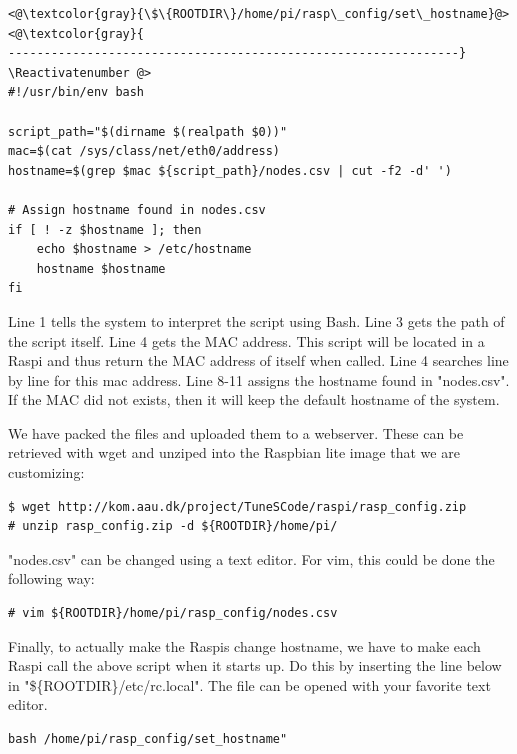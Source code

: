 \Suppressnumber\begin{lstlisting}[]
<@\textcolor{gray}{\$\{ROOTDIR\}/home/pi/rasp\_config/set\_hostname}@>
<@\textcolor{gray}{
---------------------------------------------------------------}
\Reactivatenumber @>
#!/usr/bin/env bash

script_path="$(dirname $(realpath $0))"
mac=$(cat /sys/class/net/eth0/address)
hostname=$(grep $mac ${script_path}/nodes.csv | cut -f2 -d' ')

# Assign hostname found in nodes.csv
if [ ! -z $hostname ]; then
    echo $hostname > /etc/hostname
    hostname $hostname
fi
\end{lstlisting}
\FloatBarrier
\vspace{-5mm}

Line 1 tells the system to interpret the script using Bash. Line 3 gets the
path of the script itself. Line 4 gets the MAC address. This script will be
located in a \ac{Raspi} and thus return the MAC address of itself when called.
Line 4 searches line by line for this mac address.
Line 8-11 assigns the hostname found in "nodes.csv". If the MAC did not exists,
then it will keep the default hostname of the system.


We have packed the files and uploaded them to a webserver. These can be
retrieved with wget and unziped into the Raspbian lite image that
we are customizing:

\begin{lstlisting}[]
$ wget http://kom.aau.dk/project/TuneSCode/raspi/rasp_config.zip
# unzip rasp_config.zip -d ${ROOTDIR}/home/pi/
\end{lstlisting}
\FloatBarrier
\vspace{-5mm}

"nodes.csv" can be changed using a text editor. For vim, this could be done
the following way:
\begin{lstlisting}[]
# vim ${ROOTDIR}/home/pi/rasp_config/nodes.csv
\end{lstlisting}
\FloatBarrier
\vspace{-5mm}


Finally, to actually make the \ac{Raspi}s change hostname, we have to make
each \ac{Raspi} call the above script when it starts up.
Do this by inserting the line below in "\$\{ROOTDIR\}/etc/rc.local".
The file
can be opened with your favorite text editor.

\begin{lstlisting}[]
bash /home/pi/rasp_config/set_hostname"
\end{lstlisting}
\FloatBarrier
\vspace{-5mm}


